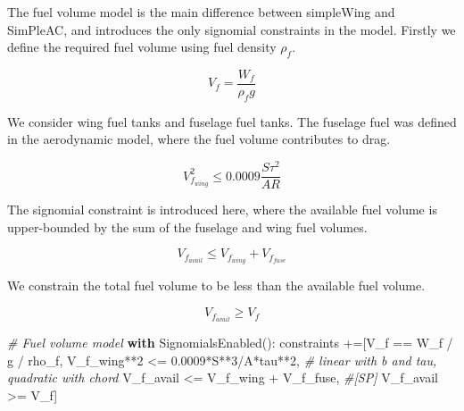 \documentclass[]{article}
\newenvironment{Shaded}{}{}
\newcommand{\DecValTok}[1]{\textcolor[rgb]{0.25,0.63,0.44}{#1}}
\newcommand{\FloatTok}[1]{\textcolor[rgb]{0.25,0.63,0.44}{#1}}
\newcommand{\CommentTok}[1]{\textcolor[rgb]{0.38,0.63,0.69}{\textit{#1}}}
\newcommand{\ControlFlowTok}[1]{\textcolor[rgb]{0.00,0.44,0.13}{\textbf{#1}}}
\newcommand{\OperatorTok}[1]{\textcolor[rgb]{0.40,0.40,0.40}{#1}}
\newcommand{\NormalTok}[1]{#1}
\begin{document}
The fuel volume model is the main difference between simpleWing and
SimPleAC, and introduces the only signomial constraints in the model.
Firstly we define the required fuel volume using fuel density
\(\rho_f\).

\begin{equation}
    V_f = \frac{W_f } {\rho_f g}
\label{e:vf}
\end{equation}

We consider wing fuel tanks and fuselage fuel tanks. The fuselage fuel
was defined in the aerodynamic model, where the fuel volume contributes
to drag.

\begin{equation}
    V_{f_{wing}}^2 \leq 0.0009 \frac{S \tau^2}{AR}
\label{e:vfwing}
\end{equation}

The signomial constraint is introduced here, where the available fuel
volume is upper-bounded by the sum of the fuselage and wing fuel
volumes.

\begin{equation}
    V_{f_{avail}} \leq V_{f_{wing}} + V_{f_{fuse}}
\label{vfavail}
\end{equation}

We constrain the total fuel volume to be less than the available fuel
volume.

\begin{equation}
    V_{f_{avail}} \geq V_{f}
\label{e:vfineq}
\end{equation}

\begin{Shaded}
\begin{Highlighting}[]
        \CommentTok{# Fuel volume model }
        \ControlFlowTok{with}\NormalTok{ SignomialsEnabled():}
\NormalTok{            constraints }\OperatorTok{+=}\NormalTok{[V_f }\OperatorTok{==}\NormalTok{ W_f }\OperatorTok{/}\NormalTok{ g }\OperatorTok{/}\NormalTok{ rho_f,}
\NormalTok{                V_f_wing}\OperatorTok{**}\DecValTok{2} \OperatorTok{<=} \FloatTok{0.0009}\OperatorTok{*}\NormalTok{S}\OperatorTok{**}\DecValTok{3}\OperatorTok{/}\NormalTok{A}\OperatorTok{*}\NormalTok{tau}\OperatorTok{**}\DecValTok{2}\NormalTok{, }
                    \CommentTok{# linear with b and tau, quadratic with chord}
\NormalTok{                V_f_avail }\OperatorTok{<=}\NormalTok{ V_f_wing }\OperatorTok{+}\NormalTok{ V_f_fuse, }\CommentTok{#[SP]}
\NormalTok{                V_f_avail }\OperatorTok{>=}\NormalTok{ V_f]}
\end{Highlighting}
\end{Shaded}
\end{document}
